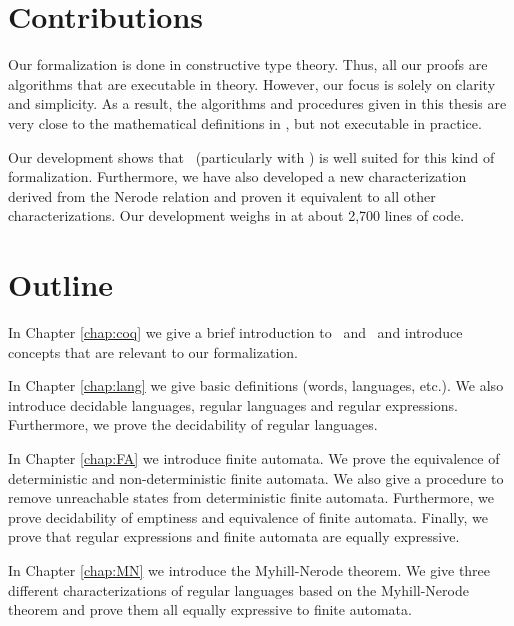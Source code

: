 \section{Contributions}
Our formalization is done in constructive type theory.
Thus, all our proofs are algorithms that are executable in theory.
However, our focus is solely on clarity and simplicity.
As a result, the algorithms and procedures given in this thesis 
are very close to the mathematical definitions in \cite{DBLP:books/daglib/0088160}, 
but not executable in practice. 

Our development shows that \coq\ (particularly with \ssreflect) is well suited for this kind of formalization.
Furthermore, we have also developed a new characterization derived from the Nerode relation and proven it equivalent to all other characterizations.
Our development weighs in at about 2,700 lines of code.


\section{Outline}
In Chapter \ref{chap:coq} we give a brief introduction to \coq\ and \ssreflect\ and introduce concepts that are relevant to our formalization.

In Chapter \ref{chap:lang} we give basic definitions (words, languages, etc.). 
We also introduce decidable languages, regular languages and regular expressions. 
Furthermore, we prove the decidability of regular languages.

In Chapter \ref{chap:FA} we introduce finite automata.
We prove the equivalence of deterministic and non-deterministic finite automata.
We also give a procedure to remove unreachable states from deterministic finite automata.
Furthermore, we prove decidability of emptiness and equivalence of finite automata.
Finally, we prove that regular expressions and finite automata are equally expressive.

In Chapter \ref{chap:MN} we introduce the Myhill-Nerode theorem.
We give three different characterizations of regular languages based on the Myhill-Nerode theorem and prove them all equally expressive to finite automata.
